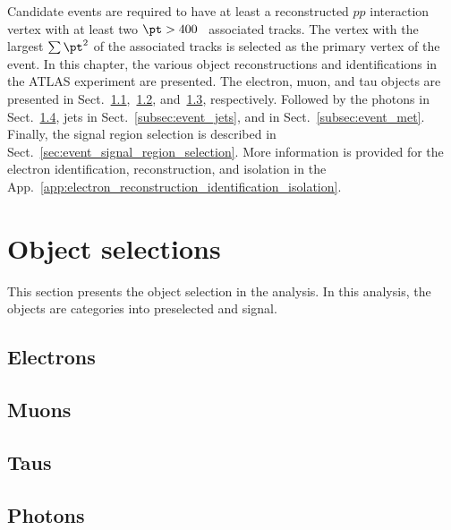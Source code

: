 Candidate events are required to have at least a reconstructed $pp$ interaction vertex with at least two $\pt > 400$~{\MeV} associated tracks.
The vertex with the largest $\sum \pt^{2}$ of the associated tracks is selected as the primary vertex of the event. 
In this chapter, the various object reconstructions and  identifications in the ATLAS experiment are presented.
The electron, muon, and tau objects are presented in Sect.~\ref{subsec:event_electrons},~\ref{subsec:event_muons}, and~\ref{subsec:event_Taus}, respectively.
Followed by the photons in Sect.~\ref{subsec:event_photons}, jets in Sect.~\ref{subsec:event_jets}, and \met in Sect.~\ref{subsec:event_met}.
Finally, the signal region selection is described in Sect.~\ref{sec:event_signal_region_selection}.
More information is provided for the electron identification, reconstruction, and isolation in the App.~\ref{app:electron_reconstruction_identification_isolation}.


\section{Object selections}
\label{sec:event_object_selections}
This section presents the object selection in the analysis.
In this analysis, the objects are categories into preselected and signal.


\subsection{Electrons}
\label{subsec:event_electrons}


\subsection{Muons}
\label{subsec:event_muons}


\subsection{Taus}
\label{subsec:event_Taus}


\subsection{Photons}
\label{subsec:event_photons}

